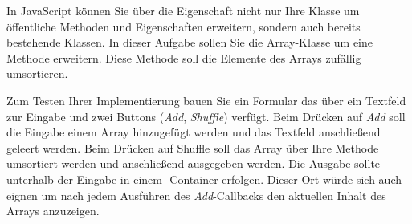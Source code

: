 %
\par In JavaScript können Sie über die  Eigenschaft nicht nur Ihre Klasse um öffentliche Methoden und Eigenschaften erweitern, sondern auch bereits bestehende Klassen. In dieser Aufgabe sollen Sie die Array-Klasse um eine Methode  erweitern. Diese Methode soll die Elemente des Arrays zufällig umsortieren.
%
\par Zum Testen Ihrer Implementierung bauen Sie ein Formular das über ein Textfeld zur Eingabe und zwei Buttons (\emph{Add}, \emph{Shuffle}) verfügt. Beim Drücken auf \emph{Add} soll die Eingabe einem Array hinzugefügt werden und das Textfeld anschließend geleert werden. Beim Drücken auf Shuffle soll das Array über Ihre Methode umsortiert werden und anschließend ausgegeben werden. Die Ausgabe sollte unterhalb der Eingabe in einem -Container erfolgen. Dieser Ort würde sich auch eignen um nach jedem Ausführen des \emph{Add}-Callbacks den aktuellen Inhalt des Arrays anzuzeigen.